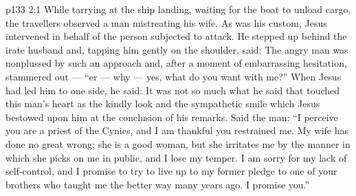 \vs p133 2:1 While tarrying at the ship landing, waiting for the boat to unload cargo, the travellers observed a man mistreating his wife. As was his custom, Jesus intervened in behalf of the person subjected to attack. He stepped up behind the irate husband and, tapping him gently on the shoulder, said:  The angry man was nonplussed by such an approach and, after a moment of embarrassing hesitation, stammered out --- “er --- why --- yes, what do you want with me?” When Jesus had led him to one side, he said:  It was not so much what he said that touched this man’s heart as the kindly look and the sympathetic smile which Jesus bestowed upon him at the conclusion of his remarks. Said the man: “I perceive you are a priest of the Cynics, and I am thankful you restrained me. My wife has done no great wrong; she is a good woman, but she irritates me by the manner in which she picks on me in public, and I lose my temper. I am sorry for my lack of self\hyp{}control, and I promise to try to live up to my former pledge to one of your brothers who taught me the better way many years ago. I promise you.”
